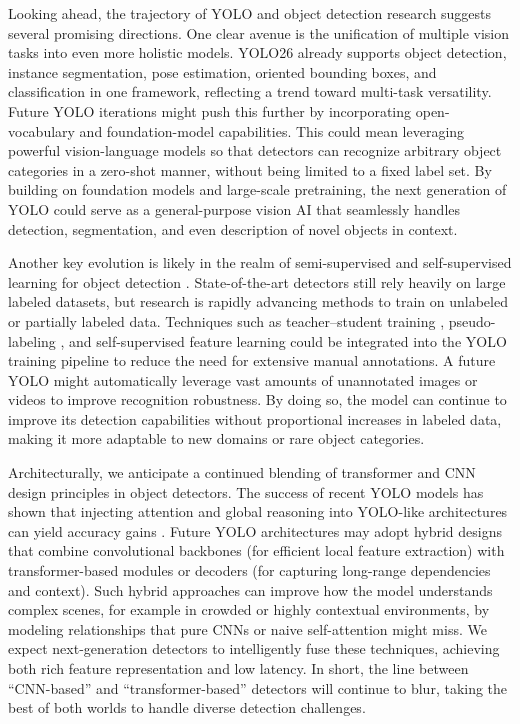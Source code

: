 \documentclass{article}
\begin{document}
Looking ahead, the trajectory of YOLO and object detection research suggests several promising directions. One clear avenue is the unification of multiple vision tasks into even more holistic models. YOLO26 already supports object detection, instance segmentation, pose estimation, oriented bounding boxes, and classification in one framework, reflecting a trend toward multi-task versatility. Future YOLO iterations might push this further by incorporating open-vocabulary and foundation-model capabilities. This could mean leveraging powerful vision-language models so that detectors can recognize arbitrary object categories in a zero-shot manner, without being limited to a fixed label set. By building on foundation models and large-scale pretraining, the next generation of YOLO could serve as a general-purpose vision AI that seamlessly handles detection, segmentation, and even description of novel objects in context.

Another key evolution is likely in the realm of semi-supervised and self-supervised learning for object detection \cite{tang2021proposal, sohn2020simple, huang2022survey, rani2023self}. State-of-the-art detectors still rely heavily on large labeled datasets, but research is rapidly advancing methods to train on unlabeled or partially labeled data. Techniques such as teacher–student training \cite{li2022cross, xu2021end, mi2022active}, pseudo-labeling \cite{li2022pseco, caine2021pseudo}, and self-supervised feature learning \cite{jing2020self}could be integrated into the YOLO training pipeline to reduce the need for extensive manual annotations. A future YOLO might automatically leverage vast amounts of unannotated images or videos to improve recognition robustness. By doing so, the model can continue to improve its detection capabilities without proportional increases in labeled data, making it more adaptable to new domains or rare object categories.

Architecturally, we anticipate a continued blending of transformer and CNN design principles in object detectors. The success of recent YOLO models has shown that injecting attention and global reasoning into YOLO-like architectures can yield accuracy gains \cite{kang2024asf, vijayakumar2024yolo}. Future YOLO architectures may adopt hybrid designs that combine convolutional backbones (for efficient local feature extraction) with transformer-based modules or decoders (for capturing long-range dependencies and context). Such hybrid approaches can improve how the model understands complex scenes, for example in crowded or highly contextual environments, by modeling relationships that pure CNNs or naive self-attention might miss. We expect next-generation detectors to intelligently fuse these techniques, achieving both rich feature representation and low latency. In short, the line between “CNN-based” and “transformer-based” detectors will continue to blur, taking the best of both worlds to handle diverse detection challenges.
\end{document}
